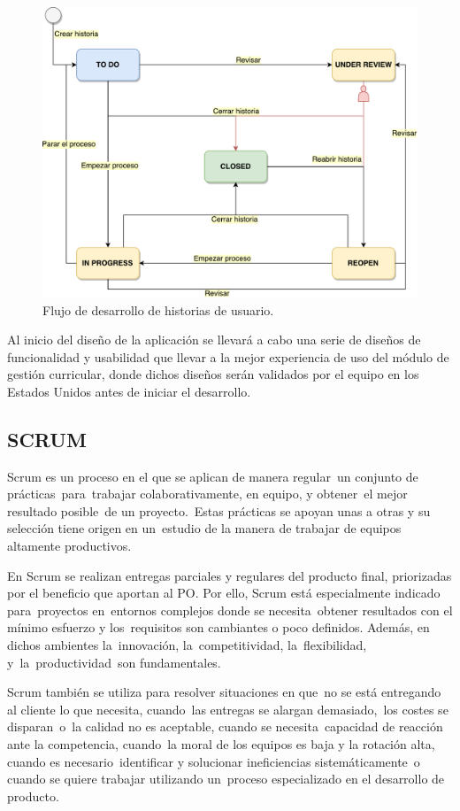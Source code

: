 \begin{figure}[]
\centering
\includegraphics[width=125mm,scale=1]{Figuras/workflow}
\caption{Flujo de desarrollo de historias de usuario.}
  \label{workflow}
\end{figure}

Al inicio del diseño de la aplicación se llevará a cabo una serie de diseños de funcionalidad y usabilidad que llevar a la mejor experiencia de uso del módulo de gestión curricular, donde dichos diseños serán validados por el equipo en los Estados Unidos antes de iniciar el desarrollo.

\subsection{SCRUM}
Scrum es un proceso en el que se aplican de manera regular un conjunto de prácticas para trabajar colaborativamente, en equipo, y obtener el mejor resultado posible de un proyecto. Estas prácticas se apoyan unas a otras y su selección tiene origen en un estudio de la manera de trabajar de equipos altamente productivos.

En Scrum se realizan entregas parciales y regulares del producto final, priorizadas por el beneficio que aportan al PO. Por ello, Scrum está especialmente indicado para proyectos en entornos complejos donde se necesita obtener resultados con el mínimo esfuerzo y los requisitos son cambiantes o poco definidos. Además, en dichos ambientes la innovación, la competitividad, la flexibilidad, y la productividad son fundamentales.

Scrum también se utiliza para resolver situaciones en que no se está entregando al cliente lo que necesita, cuando las entregas se alargan demasiado, los costes se disparan o la calidad no es aceptable, cuando se necesita capacidad de reacción ante la competencia, cuando la moral de los equipos es baja y la rotación alta, cuando es necesario identificar y solucionar ineficiencias sistemáticamente o cuando se quiere trabajar utilizando un proceso especializado en el desarrollo de producto. 

